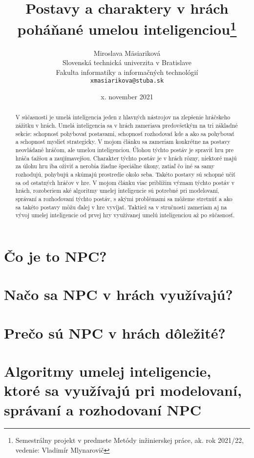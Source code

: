 \documentclass[10pt,twoside,slovak,a4paper]{article}
\title{Postavy a charaktery v hrách poháňané umelou inteligenciou\thanks{Semestrálny projekt v predmete Metódy inžinierskej práce, ak. rok 2021/22, vedenie: Vladimír Mlynarovič}} %
\author{Miroslava Mäsiariková\\[2pt]
	{\small Slovenská technická univerzita v Bratislave}\\
	{\small Fakulta informatiky a informačných technológií}\\
	{\small \texttt{xmasiarikova@stuba.sk}}
	}
\date{\small x. november 2021} %
\begin{document}
\maketitle

\begin{abstract}

V súčasnosti je umelá inteligencia jeden z hlavných nástrojov na zlepšenie hráčskeho zážitku v hrách. Umelá inteligencia sa v hrách zameriava predovšetkým na tri základné sekcie: schopnosť pohybovať postavami, schopnosť rozhodovať kde a ako sa pohybovať a schopnosť myslieť strategicky. V mojom článku sa zameriam konkrétne na postavy neovládané hráčom, ale umelou inteligenciou. Úlohou týchto postáv je spraviť hru pre hráča ťažšou a zaujímavejšou. Charakter týchto postáv je v hrách rôzny, niektoré majú za úlohu hru iba oživiť a nerobia žiadne špeciálne úkony, zatiaľ čo iné sa samy rozhodujú, pohybujú a skúmajú prostredie okolo seba. Takéto postavy sú schopné učiť sa od ostatných hráčov v hre. V mojom článku viac priblížim význam týchto postáv v hrách, rozoberiem aké algoritmy umelej inteligencie sú potrebné pri modelovaní, správaní a rozhodovaní týchto postáv, s akými problémami sa môžeme stretnúť a ako sa takéto postavy môžu ďalej v hre vyvíjať. Taktiež sa v stručnosti zameriam aj na vývoj umelej inteligencie od prvej hry využívanej umelú inteligenciou až po súčasnosť. 

\end{abstract}


\section{Čo je to NPC?}  \label{nejaka}

\begin{figure*}[tbh]
\centering

\end{figure*}


\section{Načo sa NPC v hrách využívajú?} \label{ina}


\section{Prečo sú NPC v hrách dôležité?} \label{dolezita}


\section{Algoritmy umelej inteligencie, ktoré sa využívajú pri modelovaní, správaní a rozhodovaní NPC} \label{dolezitejsia}
\end{document}
